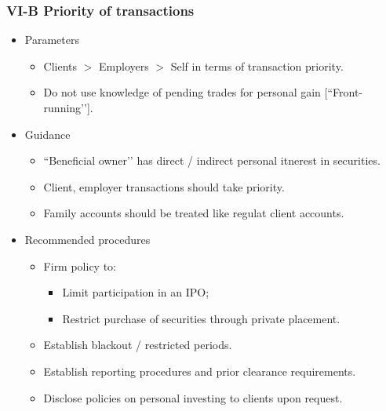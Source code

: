 \documentclass[../notes_compiled.tex]{subfiles}
\begin{document}
\subsubsection{VI-B Priority of transactions}
\begin{itemize}
\item Parameters
\begin{itemize}
\item Clients $>$ Employers $>$ Self in terms of transaction priority.
\item Do not use knowledge of pending trades for personal gain [``Front-running’’].
\end{itemize}
\item Guidance
\begin{itemize}
\item ``Beneficial owner’’ has direct / indirect personal itnerest in securities.
\item Client, employer transactions should take priority.
\item Family accounts should be treated like regulat client accounts.
\end{itemize}
\item Recommended procedures
\begin{itemize}
\item Firm policy to:
\begin{itemize}
\item Limit participation in an IPO;
\item Restrict purchase of securities through private placement.
\end{itemize}
\item Establish blackout / restricted periods.
\item Establish reporting procedures and  prior clearance requirements.
\item Disclose policies on personal investing to clients upon request.
\end{itemize}
\end{itemize}
\end{document}
